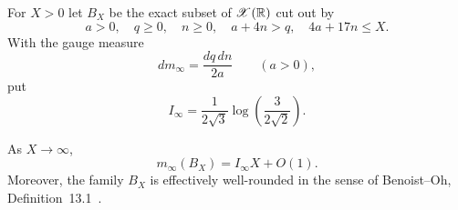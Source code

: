 For $X>0$ let $B_X$ be the exact subset of $\mathscr X(\mathbb R)$ cut out by
\begin{equation}
 a>0,\quad q\geq0,\quad n\geq0,\quad a+4n>q,
 \quad4a+17n\leq X.
 \label{koide-param-eq:B-X}
\end{equation}
With the gauge measure
\begin{equation}
 dm_\infty=\frac{dq\,dn}{2a}\qquad(a>0),
 \label{koide-param-eq:gauge-measure}
\end{equation}
put
\begin{equation}
 I_\infty=\frac1{2\sqrt3}
 \log\!\left(\frac3{2\sqrt2}\right).
 \label{koide-param-eq:I-infty}
\end{equation}

\begin{lemma}
\label{koide-param-lem:volume}
As $X\to\infty$,
\begin{equation}
 m_\infty(B_X)=I_\infty X+O(1).
 \label{koide-param-eq:volume-linear-O1}
\end{equation}
Moreover, the family $B_X$ is effectively well-rounded in the sense of
Benoist--Oh, Definition~13.1~\cite[p.~1931]{BenoistOh_2012}.
\end{lemma}

